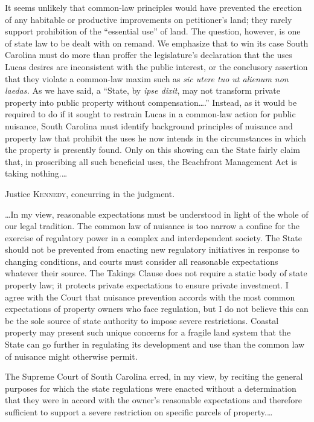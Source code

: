 It seems unlikely that common-law principles would have prevented the erection
of any habitable or productive improvements on petitioner's land; they rarely
support prohibition of the ``essential use'' of land. The question, however, is
one of state law to be dealt with on remand. We emphasize that to win its case
South Carolina must do more than proffer the legislature's declaration that the
uses Lucas desires are inconsistent with the public interest, or the conclusory
assertion that they violate a common-law maxim such as \textit{sic utere tuo ut
alienum non laedas.} As we have said, a ``State, by \textit{ipse dixit}, may not
transform private property into public property without compensation\ldots.''
Instead, as it would be required to do if it sought to restrain Lucas in a
common-law action for public nuisance, South Carolina must identify background
principles of nuisance and property law that prohibit the uses he now intends in
the circumstances in which the property is presently found. Only on this showing
can the State fairly claim that, in proscribing all such beneficial uses, the
Beachfront Management Act is taking nothing.\ldots

\opinion Justice \textsc{Kennedy}, concurring in the judgment.

\ldots In my view, reasonable expectations must be understood in light of the
whole of our legal tradition. The common law of nuisance is too narrow a confine
for the exercise of regulatory power in a complex and interdependent society.
The State should not be prevented from enacting new regulatory initiatives in
response to changing conditions, and courts must consider all reasonable
expectations whatever their source. The Takings Clause does not require a static
body of state property law; it protects private expectations to ensure private
investment. I agree with the Court that nuisance prevention accords with the
most common expectations of property owners who face regulation, but I do not
believe this can be the sole source of state authority to impose severe
restrictions. Coastal property may present such unique concerns for a fragile
land system that the State can go further in regulating its development and use
than the common law of nuisance might otherwise permit.

The Supreme Court of South Carolina erred, in my view, by reciting the general
purposes for which the state regulations were enacted without a determination
that they were in accord with the owner's reasonable expectations and therefore
sufficient to support a severe restriction on specific parcels of
property.\ldots

